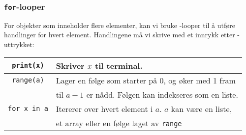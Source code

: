 \subsubsection{\texttt{for}-looper}
For objekter som inneholder flere elementer, kan vi bruke -looper til å utføre handlinger for hvert element. Handlingene må vi skrive med et innrykk etter -uttrykket:
\newpage
\begin{center}
	\begin{tabular}{c|l} \hline
		\texttt{print(x)} & Skriver $ x $ til terminal. \\ \hline
		\texttt{range(a)} & Lager en følge som starter på 0, og øker med 1 fram \\
		&til $ a-1 $ er nådd. Følgen kan indekseres som en liste.		\\ \hline
		\texttt{for x in a} & Itererer over hvert element i $ a $. $ a $ kan være en liste, \\
		&et array eller en følge laget av \texttt{range} \\
	\end{tabular} 
\end{center}

